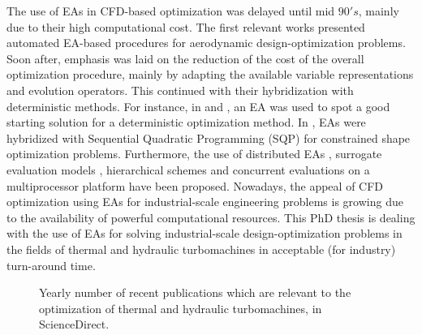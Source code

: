 The use of EAs in CFD-based optimization was delayed until mid $90's$, mainly due to their high computational cost. The first relevant works \cite{kn:Quag95,per:95,kn:Gala96} presented automated EA-based procedures for aerodynamic design-optimization problems. Soon after, emphasis was laid on the reduction of the cost of the overall optimization procedure, mainly by adapting the available variable representations and evolution operators. This continued with their hybridization with deterministic methods. For instance, in \cite{kn:Mar97} and \cite{kn:Fost97}, an EA was used to spot a good starting solution for a deterministic optimization method. In \cite{dennis:99}, EAs were hybridized with Sequential Quadratic Programming (SQP) for constrained shape optimization problems. Furthermore,  the use of distributed EAs \cite{kn:Door1997,kn:SefrThes}, surrogate evaluation models \cite{kn:Ratl98,kn:Gio99,kn:Gian1999,kn:EBNK,phd_Kampolis}, hierarchical schemes \cite{kn:Eby1998,kn:Sef2000,knowles00mpaes_x41,desideri03,phd_Kampolis} and concurrent evaluations on a multiprocessor platform \cite{kn:LeeH96,phd_Giotis,phd_Vera} have been proposed. Nowadays, the appeal of CFD optimization using EAs for industrial-scale engineering problems is growing due to the availability of powerful computational resources. This PhD thesis is dealing with the use of EAs for solving industrial-scale design-optimization problems in the fields of thermal and hydraulic turbomachines in acceptable (for industry) turn-around time.   


\begin{figure}[h!]
\begin{minipage}[b]{1\linewidth}
 \centering
\end{minipage}
\caption{Yearly number of recent publications which are relevant to the optimization of thermal and hydraulic turbomachines, in ScienceDirect.} 
\label{pubs.turbo}
\end{figure}
 

